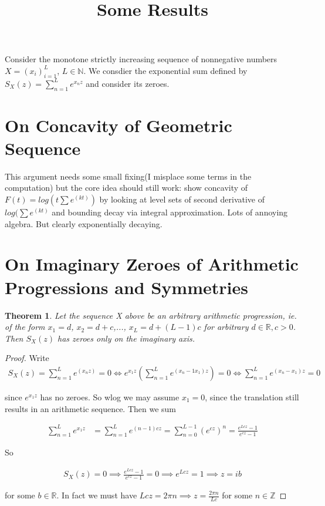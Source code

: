 \documentclass[10pt]{article}
\title{\vspace{-3em}Some Results}
\newcommand{\1}{\textbf{1}}
\newcommand{\R}{\mathbb{R}}
\newcommand{\Z}{\mathbb{Z}}
\newcommand{\N}{\mathbb{N}}
\newtheorem{theorem}{Theorem}
\theoremstyle{remark}
\theoremstyle{definition}
\begin{document}
Consider the monotone strictly increasing sequence of nonnegative numbers $X = (x_i)_{i=1}^L$, $L \in \N$. We consdier the exponential sum defined by $S_X(z) = \sum_{n=1}^L e^{x_nz}$ and consider its zeroes. 


\section{On Concavity of Geometric Sequence}

This argument needs some small fixing(I misplace some terms in the computation) but the core idea should still work: show concavity of $F(t) = log(t\sum e^(k t))$ by looking at level sets of second derivative of $log(\sum e^(kt)$ and bounding decay via integral approximation. Lots of annoying algebra. But clearly exponentially decaying.

\section{On Imaginary Zeroes of Arithmetic Progressions and Symmetries}

\begin{theorem}
	Let the sequence X above be an arbitrary arithmetic progression, ie. of the form $x_1 = d$, $x_2 = d+c$,..., $x_L = d + (L-1)c$ for arbitrary $d \in \R, c > 0$. Then $S_X(z)$ has zeroes only on the imaginary axis.
\end{theorem}

\begin{proof}
 Write 
	\begin{align*}
		S_X(z) = \sum_{n=1}^L e^(x_n z) = 0 \iff e^{x_1z}(\sum_{n=1}^L e^{(x_n-1x_1)z}) = 0 \iff \sum_{n=1}^L e^{(x_n-x_1)z} = 0
	\end{align*}

	since $e^{x_1z}$ has no zeroes. So wlog we may assume $x_1 = 0$, since the translation still results in an arithmetic sequence. Then we sum

	\begin{align*}
		\sum_{n=1}^L e^{x_1 z} &= \sum_{n=1}^L e^{(n-1)cz} = \sum_{n=0}^{L-1}(e^{cz})^{n} = \frac{e^{Lcz}-1}{e^{cz}-1}
	\end{align*}

	So 

	\begin{align*}
		S_X(z) = 0 \implies \frac{e^{Lcz}-1}{e^{cz}-1} = 0 \implies e^{Lcz} = 1 \implies z = ib
	\end{align*}

	for some $b \in \R$. In fact we must have $Lcz = 2\pi n \implies z = \frac{2 \pi n}{L c}$ for some $n \in \Z$
\end{proof} 
\end{document}

